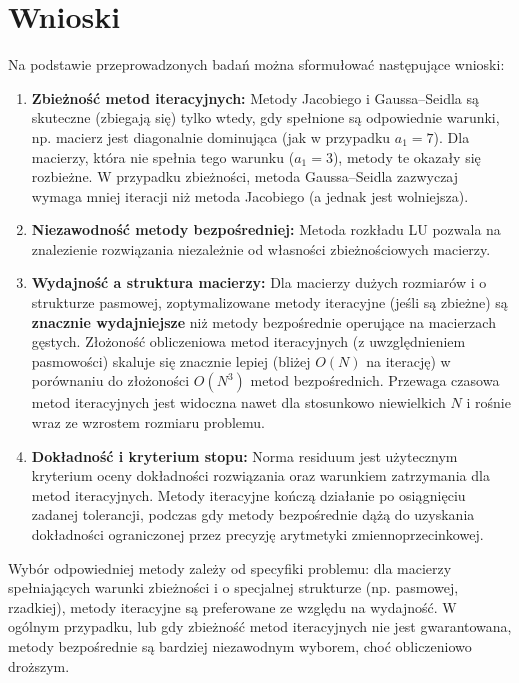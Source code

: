 \documentclass[a4paper, 11pt]{article}
\begin{document}
\section{Wnioski}
Na podstawie przeprowadzonych badań można sformułować następujące wnioski:
\begin{enumerate}
    \item \textbf{Zbieżność metod iteracyjnych:} Metody Jacobiego i Gaussa--Seidla są skuteczne (zbiegają się) tylko wtedy, gdy spełnione są odpowiednie warunki, np. macierz jest diagonalnie dominująca (jak w przypadku $a_1=7$). Dla macierzy, która nie spełnia tego warunku ($a_1=3$), metody te okazały się rozbieżne. W przypadku zbieżności, metoda Gaussa--Seidla zazwyczaj wymaga mniej iteracji niż metoda Jacobiego (a jednak jest wolniejsza).
    \item \textbf{Niezawodność metody bezpośredniej:} Metoda rozkładu LU pozwala na znalezienie rozwiązania niezależnie od własności zbieżnościowych macierzy.
    \item \textbf{Wydajność a struktura macierzy:} Dla macierzy dużych rozmiarów i o strukturze pasmowej, zoptymalizowane metody iteracyjne (jeśli są zbieżne) są \textbf{znacznie wydajniejsze} niż metody bezpośrednie operujące na macierzach gęstych. Złożoność obliczeniowa metod iteracyjnych (z uwzględnieniem pasmowości) skaluje się znacznie lepiej (bliżej $O(N)$ na iterację) w porównaniu do złożoności $O(N^3)$ metod bezpośrednich. Przewaga czasowa metod iteracyjnych jest widoczna nawet dla stosunkowo niewielkich $N$ i rośnie wraz ze wzrostem rozmiaru problemu.
    \item \textbf{Dokładność i kryterium stopu:} Norma residuum jest użytecznym kryterium oceny dokładności rozwiązania oraz warunkiem zatrzymania dla metod iteracyjnych. Metody iteracyjne kończą działanie po osiągnięciu zadanej tolerancji, podczas gdy metody bezpośrednie dążą do uzyskania dokładności ograniczonej przez precyzję arytmetyki zmiennoprzecinkowej.
\end{enumerate}
Wybór odpowiedniej metody zależy od specyfiki problemu: dla macierzy spełniających warunki zbieżności i o specjalnej strukturze (np. pasmowej, rzadkiej), metody iteracyjne są preferowane ze względu na wydajność. W ogólnym przypadku, lub gdy zbieżność metod iteracyjnych nie jest gwarantowana, metody bezpośrednie są bardziej niezawodnym wyborem, choć obliczeniowo droższym.
\end{document}
